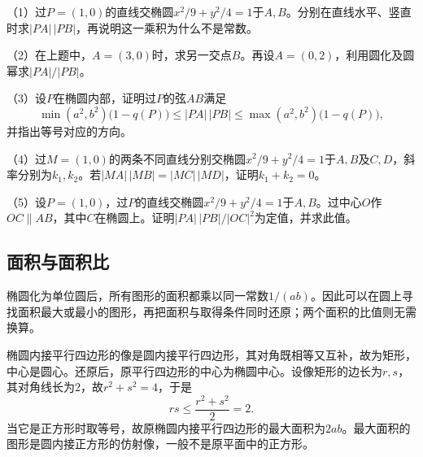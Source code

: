 \begin{exercise}
\mbox{}\par\nobreak

\begin{samepage}
（1）过\(P=(1,0)\)的直线交椭圆\(x^2/9+y^2/4=1\)于\(A,B\)。分别在直线水平、竖直时求\(|PA|\,|PB|\)，再说明这一乘积为什么不是常数。
\par
\end{samepage}

\begin{samepage}
（2）在上题中，\(A=(3,0)\)时，求另一交点\(B\)。再设\(A=(0,2)\)，利用圆化及圆幂求\(|PA|/|PB|\)。
\par
\end{samepage}

\begin{samepage}
（3）设\(P\)在椭圆内部，证明过\(P\)的弦\(AB\)满足
\begin{equation*}
    \min(a^2,b^2)\bigl(1-q(P)\bigr)\le |PA|\,|PB|
    \le\max(a^2,b^2)\bigl(1-q(P)\bigr) ,
\end{equation*}
并指出等号对应的方向。
\par
\end{samepage}
\begin{samepage}
（4）过\(M=(1,0)\)的两条不同直线分别交椭圆\(x^2/9+y^2/4=1\)于\(A,B\)及\(C,D\)，斜率分别为\(k_1,k_2\)。若\(|MA|\,|MB|=|MC|\,|MD|\)，证明\(k_1+k_2=0\)。
\par
\end{samepage}

\begin{samepage}
（5）设\(P=(1,0)\)，过\(P\)的直线交椭圆\(x^2/9+y^2/4=1\)于\(A,B\)。过中心\(O\)作\(OC\parallel AB\)，其中\(C\)在椭圆上。证明\(|PA|\,|PB|/|OC|^2\)为定值，并求此值。
\par
\end{samepage}
\end{exercise}

\subsection{面积与面积比}
\label{subsec:quadratic-affine-area-and-extrema}

椭圆化为单位圆后，所有图形的面积都乘以同一常数\(1/(ab)\)。因此可以在圆上寻找面积最大或最小的图形，再把面积与取得条件同时还原；两个面积的比值则无需换算。

椭圆内接平行四边形的像是圆内接平行四边形，其对角既相等又互补，故为矩形，中心是圆心。还原后，原平行四边形的中心为椭圆中心。设像矩形的边长为\(r,s\)，其对角线长为\(2\)，故\(r^2+s^2=4\)，于是
\begin{equation*}
    rs\le\frac{r^2+s^2}{2}=2 .
\end{equation*}
当它是正方形时取等号，故原椭圆内接平行四边形的最大面积为\(2ab\)。最大面积的图形是圆内接正方形的仿射像，一般不是原平面中的正方形。

